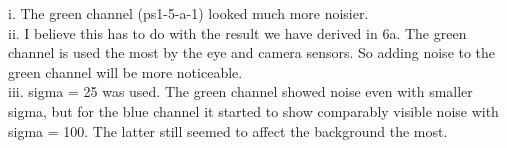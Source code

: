 i. The green channel (ps1-5-a-1) looked much more noisier.\\
ii. I believe this has to do with the result we have derived in 6a. The green channel is used the most by the eye and camera sensors. So adding noise to the green channel will be more noticeable.\\
iii. sigma = 25 was used. The green channel showed noise even with smaller sigma, but for the blue channel it started to show comparably visible noise with sigma = 100. The latter still seemed to affect the background the most.